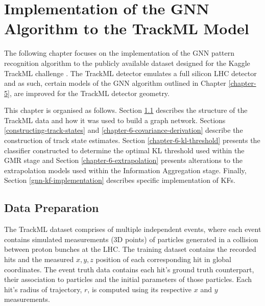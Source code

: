 


\chapter{Implementation of the GNN Algorithm to the TrackML Model}
\label{chapter-6}

The following chapter focuses on the implementation of the GNN pattern recognition algorithm to the publicly available dataset designed for the Kaggle TrackML challenge \cite{kaggle-trackml}. The TrackML detector emulates a full silicon LHC detector and as such, certain models of the GNN algorithm outlined in Chapter \ref{chapter-5}, are improved for the TrackML detector geometry.

This chapter is organised as follows. Section \ref{chapter-6-data-prep} describes the structure of the TrackML data and how it was used to build a graph network. Sections \ref{constructing-track-states} and \ref{chapter-6-covariance-derivation} describe the construction of track state estimates. Section \ref{chapter-6-kl-threshold} presents the classifier constructed to determine the optimal KL threshold used within the GMR stage and Section \ref{chapter-6-extrapolation} presents alterations to the extrapolation models used within the Information Aggregation stage. Finally, Section \ref{gnn-kf-implementation} describes specific implementation of KFs. 
 





\section{Data Preparation}
\label{chapter-6-data-prep}

The TrackML dataset \cite{kaggle-trackml-data} comprises of multiple independent events, where each event contains simulated measurements (3D points) of particles generated in a collision between proton bunches at the LHC. The training dataset contains the recorded hits and the measured $x, y, z$ position of each corresponding hit in global coordinates. The event truth data contains each hit's ground truth counterpart, their association to particles and the initial parameters of those particles. Each hit's radius of trajectory, $r$, is computed using its respective $x$ and $y$ measurements.

